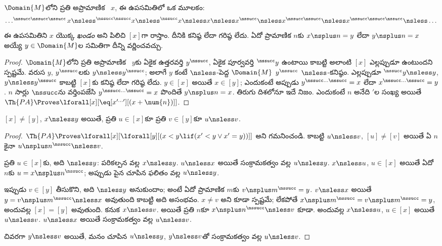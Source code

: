 \documentclass[../../../include/open-logic-section]{subfiles}
\begin{document}
\begin{prop}
$\Domain{M}$లోని ప్రతి అప్రామాణిక
~$x$, ఈ ఉపసమితిలో ఒక మూలకం:
\[
\dots ^{\nssucc\nssucc\nssucc}x \nsless ^{\nssucc\nssucc}x \nsless
^{\nssucc}x \nsless x \nsless x^{\nssucc} \nsless x^{\nssucc\nssucc}
\nsless x^{\nssucc\nssucc\nssucc} \nsless \dots
\]
ఈ ఉపసమితిని $x$ యొక్క \emph{ఖండం} అని పిలిచి $[x]$గా రాస్తాం.
దీనికి కనిష్ఠ లేదా గరిష్ఠ  లేదు.
ఏదో ప్రామాణిక $n$కు $x\nsplus n=y$ లేదా $y\nsplus n=x$ అయ్యే
$y\in\Domain{M}$ల సమితిగా దీన్ని వర్ణించవచ్చు.
\end{prop}

\begin{proof}
$\Domain{M}$లోని ప్రతి అప్రామాణిక ~$y$కు ఏకైక
ఉత్తరవర్తి $y^\nssucc$, ఏకైక పూర్వవర్తి $^\nssucc y$ ఉంటాయి
కాబట్టి అలాంటి $[x]$ ఎల్లప్పుడూ ఉంటుందని స్పష్టమే. వరుస
 $y$, $y^\nssucc$లకు
$y\nsless y^\nssucc$; అలాగే $y$ కంటే $\nsless$-పెద్ద
$\Domain{M}$  $y^\nssucc$ $\nsless$-కనిష్ఠం.
ఎల్లప్పుడూ $^\nssucc y\nsless y$, $y\nsless y^\nssucc$ కాబట్టి
$[x]$కు కనిష్ఠ లేదా గరిష్ఠ  లేదు.
$y\in[x]$ అయితే $x\in[y]$; ఎందుకంటే అప్పుడు
$y^{\nssucc\dots\nssucc}=x$ లేదా
$x^{\nssucc\dots\nssucc}=y$. $n$ సార్లు $\nssucc$ను వర్తింపజేసి
$y^{\nssucc\dots\nssucc}=x$ పొందితే $y\nsplus n=x$. తిరుగు దిశలోనూ ఇదే నిజం. ఎందుకంటే $n$ అనేది $\prime$ల సంఖ్య అయితే
$\Th{PA}\Proves\lforall[x][\eq[x^{\prime\dots\prime}][(x+\num{n})]]$.
\end{proof}

\begin{prop}
$[x]\neq[y]$, $x\nsless y$ అయితే, ప్రతి $u\in[x]$కూ ప్రతి
$v\in[y]$కూ $u\nsless v$.
\end{prop}

\begin{proof}
$\Th{PA}\Proves\lforall[x][\lforall[y][(x<y\lif
(x'<y\lor x'=y))]]$ అని గమనించండి. కాబట్టి $u\nsless v$,
$[u]\neq[v]$ అయితే ఏ $n$కైనా $u\nsplus n^\nssucc\nsless v$.

ప్రతి $u\in[x]$కు, అది $\nsless y$: పరికల్పన వల్ల $x\nsless y$.
$u\nsless x$ అయితే సంక్రామకత్వం వల్ల $u\nsless y$. $x\nsless u$,
$u\in[x]$ అయితే ఏదో $n$కు $u=x\nsplus n^\nssucc$; అప్పుడు పైన చూపిన ఫలితం వల్ల $u\nsless y$.

ఇప్పుడు $v\in[y]$ తీసుకొని, అది $\nsless y$ అనుకుందాం; అంటే ఏదో ప్రామాణిక
$m$కు $v\nsplus m^\nssucc=y$. $v\nsless x$ అయితే
$y=v\nsplus m^\nssucc\nsless x$ అవుతుంది కాబట్టి అది అసంభవం.
$x\neq v$ అని కూడా స్పష్టమే; లేకపోతే
$x\nsplus m^\nssucc=v\nsplus m^\nssucc=y$, అందువల్ల
$[x]=[y]$ అవుతుంది. కనుక $x\nsless v$. అయితే ప్రతి $n$కూ
$x\nsplus n^\nssucc\nsless v$ కూడా. అందువల్ల $x\nsless u$,
$u\in[x]$ అయితే $u\nsless v$. $u\nsless x$ అయితే సంక్రామకత్వం
వల్ల $u\nsless v$.

చివరగా $y\nsless v$ అయితే, మనం చూపిన $u\nsless y$, $y\nsless v$తో సంక్రామకత్వం వల్ల $u\nsless v$.
\end{proof}
\end{document}
